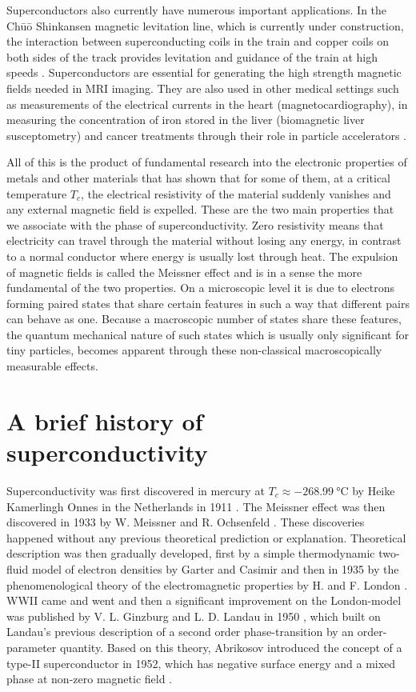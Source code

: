 Superconductors also currently have numerous important applications. In the Ch\=u\=o Shinkansen magnetic levitation line, which is currently
under construction, the interaction between superconducting coils in the train and copper coils on both sides of the track provides levitation and
guidance of the train at high speeds \cite{Bernstein20}. Superconductors are essential for generating the high strength magnetic fields needed
in MRI imaging. They are also used in other medical settings such as measurements of the electrical currents in the heart (magnetocardiography),
in measuring the concentration of iron stored in the liver (biomagnetic liver susceptometry) and cancer treatments through their role in 
particle accelerators \cite{Alonso12}.

All of this is the product of fundamental research into the electronic properties of metals and other materials that has shown that for some
of them, at a critical temperature $T_c$, the electrical resistivity of the material suddenly vanishes and any external magnetic field is expelled. These
are the two main properties that we associate with the phase of superconductivity. Zero resistivity means that electricity can travel through the
material without losing any energy, in contrast to a normal conductor where energy is usually lost through heat.
The expulsion of magnetic fields is called the Meissner effect and is in a sense the more fundamental
of the two properties. On a microscopic level it is due to electrons forming paired states that share certain features in such a way that different pairs
can behave as one. Because a macroscopic number of states share these features, the quantum mechanical nature of such states which is usually
only significant for tiny particles, becomes apparent through these non-classical macroscopically measurable effects.


\section{A brief history of superconductivity}

Superconductivity was first discovered in mercury at $T_c\approx\SI{-268.99}{\degreeCelsius}$ by Heike Kamerlingh Onnes in the Netherlands in 1911 \cite{Onnes}.
The Meissner effect was then discovered in 1933 by W. Meissner and R. Ochsenfeld \cite{Meissner33}. These discoveries happened without any previous
theoretical prediction or explanation. Theoretical description was then gradually developed, first by a simple thermodynamic two-fluid model of electron densities
by Garter and Casimir and then in 1935 by the phenomenological theory of the electromagnetic properties by H. and F. London \cite{London35}. WWII
came and went and then a significant improvement on the London-model was published by V. L. Ginzburg and L. D. Landau in 1950 \cite{Ginzburg50}, which built on Landau's
previous description \cite{Landau37} of a second order phase-transition by an order-parameter quantity. Based on this theory, Abrikosov introduced
the concept of a type-II superconductor in 1952, which has negative surface energy and a mixed phase at non-zero magnetic field \cite{Abrikosov52}.

